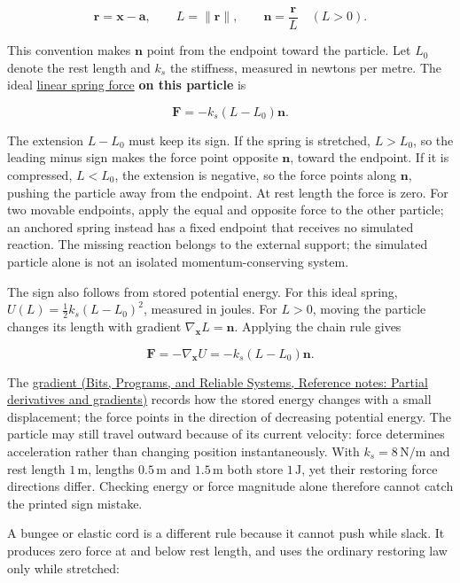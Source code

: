 \[
\mathbf{r}=\mathbf{x}-\mathbf{a},\qquad
L=\|\mathbf r\|,\qquad
\mathbf n=\frac{\mathbf r}{L}\quad(L>0).
\]

This convention makes \(\mathbf n\) point from the endpoint toward the particle. Let \(L_0\) denote the rest length and \(k_s\) the stiffness, measured in newtons per metre. The ideal \hyperref[appendix-e040e2108923]{linear spring force} \textbf{on this particle} is

\[
\mathbf F=-k_s(L-L_0)\mathbf n.
\]

The extension \(L-L_0\) must keep its sign. If the spring is stretched, \(L>L_0\), so the leading minus sign makes the force point opposite \(\mathbf n\), toward the endpoint. If it is compressed, \(L<L_0\), the extension is negative, so the force points along \(\mathbf n\), pushing the particle away from the endpoint. At rest length the force is zero. For two movable endpoints, apply the equal and opposite force to the other particle; an anchored spring instead has a fixed endpoint that receives no simulated reaction. The missing reaction belongs to the external support; the simulated particle alone is not an isolated momentum-conserving system.

The sign also follows from stored potential energy. For this ideal spring, \(U(L)=\tfrac12k_s(L-L_0)^2\), measured in joules. For \(L>0\), moving the particle changes its length with gradient \(\nabla_{\mathbf x}L=\mathbf n\). Applying the chain rule gives

\[
\mathbf F=-\nabla_{\mathbf x}U=-k_s(L-L_0)\mathbf n.
\]

The \href{../01-Bits-Programs-and-Reliable-Systems/main.pdf\#nameddest=appendix-677b59746ae0}{gradient (Bits, Programs, and Reliable Systems, Reference notes: Partial derivatives and gradients)} records how the stored energy changes with a small displacement; the force points in the direction of decreasing potential energy. The particle may still travel outward because of its current velocity: force determines acceleration rather than changing position instantaneously. With \(k_s=8\,\mathrm{N/m}\) and rest length \(1\,\mathrm m\), lengths \(0.5\,\mathrm m\) and \(1.5\,\mathrm m\) both store \(1\,\mathrm J\), yet their restoring force directions differ. Checking energy or force magnitude alone therefore cannot catch the printed sign mistake.

A bungee or elastic cord is a different rule because it cannot push while slack. It produces zero force at and below rest length, and uses the ordinary restoring law only while stretched:

